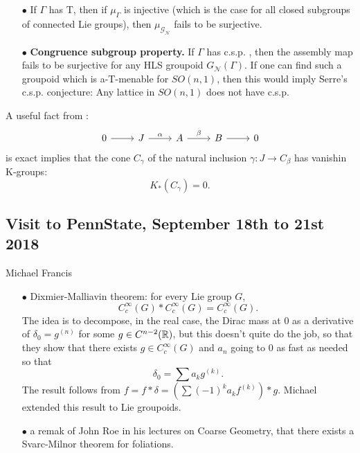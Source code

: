 \begin{itemize}
\item[$\bullet$] If $\Gamma$ has T, then if $\mu_\Gamma$ is injective (which is the case for all closed subgroups of connected Lie groups), then $\mu_{\mathcal G_{\mathcal N}}$ fails to be surjective.\\

\item[$\bullet$] \textbf{Congruence subgroup property.} If $\Gamma$ has c.s.p. , then the assembly map fails to be surjective for any HLS groupoid $G_{\mathcal N}(\Gamma)$. If one can find such a groupoid which is a-T-menable for $SO(n,1)$, then this would imply Serre's c.s.p. conjecture: Any lattice in $SO(n,1)$ does not have c.s.p.\\
\end{itemize}

A useful fact from \cite{HLS}: 
\[\begin{tikzcd}0 \arrow{r} & J \arrow{r}{\alpha} & A \arrow{r}{\beta} &  B \arrow{r} & 0 \end{tikzcd}\]
is exact implies that the cone $C_\gamma$ of the natural inclusion $\gamma : J \rightarrow C_\beta$ has vanishin K-groups: \[K_*(C_\gamma) = 0.\]

\subsection{Visit to PennState, September 18th to 21st 2018}

Michael Francis\\

\begin{itemize}
\item[$\bullet$] Dixmier-Malliavin theorem: for every Lie group $G$,
\[ C_c^\infty(G) \ast C_c^\infty(G) = C_c^\infty(G). \]
The idea is to decompose, in the real case, the Dirac mass at $0$ as a derivative of $\delta_0 =g^{(n)}$ for some $g\in C^{n-2}(\mathbb R)$, but this doesn't quite do the job, so that they show that there exists $g\in C_c^\infty(G)$ and $a_n$ going to $0$ as fast as needed so that 
\[\delta_ 0 = \sum a_k g^{(k)}.\]
The result follows from $f=f\ast \delta = (\sum (-1)^k a_k f^{(k)}) \ast g$. Michael extended this result to Lie groupoids.\\
\item[$\bullet$] a remak of John Roe in his lectures on Coarse Geometry, that there exists a Svarc-Milnor theorem for foliations.\\
\end{itemize}

